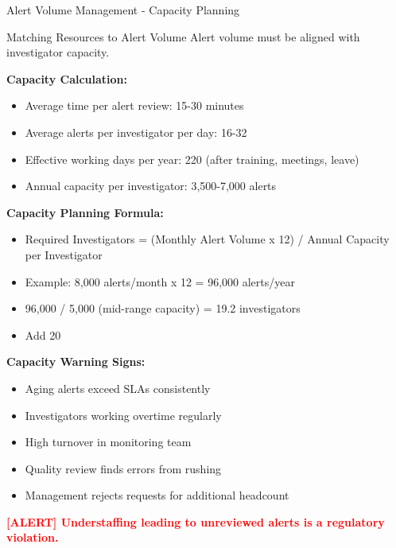 \documentclass[11pt,a4paper]{beamer}
\newcommand{\redflag}[1]{\textcolor{red}{\textbf{[ALERT] #1}}}
\begin{document}
	\begin{frame}{Alert Volume Management - Capacity Planning}
	\begin{block}{Matching Resources to Alert Volume}
		Alert volume must be aligned with investigator capacity.
	\end{block}
	
	\textbf{Capacity Calculation:}
	\begin{itemize}
		\item Average time per alert review: 15-30 minutes
		\item Average alerts per investigator per day: 16-32
		\item Effective working days per year: 220 (after training, meetings, leave)
		\item Annual capacity per investigator: 3,500-7,000 alerts
	\end{itemize}
	
	\textbf{Capacity Planning Formula:}
	\begin{itemize}
		\item Required Investigators = (Monthly Alert Volume x 12) / Annual Capacity per Investigator
		\item Example: 8,000 alerts/month x 12 = 96,000 alerts/year
		\item 96,000 / 5,000 (mid-range capacity) = 19.2 investigators
		\item Add 20%
	\end{itemize}
	
	\textbf{Capacity Warning Signs:}
	\begin{itemize}
		\item Aging alerts exceed SLAs consistently
		\item Investigators working overtime regularly
		\item High turnover in monitoring team
		\item Quality review finds errors from rushing
		\item Management rejects requests for additional headcount
	\end{itemize}
	
	\redflag{Understaffing leading to unreviewed alerts is a regulatory violation.}
	\end{frame}
	
\end{document}
